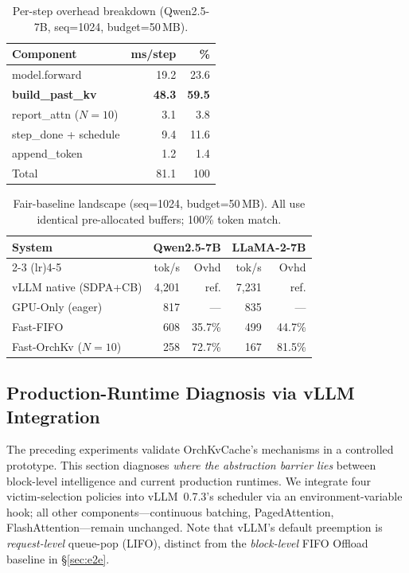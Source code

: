 \documentclass[conference]{IEEEtran}
\begin{document}
\begin{table}[t]
\centering
\caption{Per-step overhead breakdown (Qwen2.5-7B, seq=1024, budget=50\,MB).}
\label{tab:overhead-breakdown}
\small
\setlength{\tabcolsep}{10pt}
\begin{tabular}{@{}lrr@{}}
\toprule
Component & ms/step & \% \\
\midrule
model.forward & 19.2 & 23.6 \\
\textbf{build\_past\_kv} & \textbf{48.3} & \textbf{59.5} \\
report\_attn ($N{=}10$) & 3.1 & 3.8 \\
step\_done + schedule & 9.4 & 11.6 \\
append\_token & 1.2 & 1.4 \\
\midrule
Total & 81.1 & 100 \\
\bottomrule
\end{tabular}
\end{table}

\begin{table}[t]
\centering
\caption{Fair-baseline landscape (seq=1024, budget=50\,MB). All use identical pre-allocated buffers; 100\% token match.}
\label{tab:fair-baseline}
\small
\setlength{\tabcolsep}{6pt}
\begin{tabular}{@{}lrrrr@{}}
\toprule
System & \multicolumn{2}{c}{Qwen2.5-7B} & \multicolumn{2}{c}{LLaMA-2-7B} \\
\cmidrule(lr){2-3} \cmidrule(lr){4-5}
& tok/s & Ovhd & tok/s & Ovhd \\
\midrule
vLLM native (SDPA+CB)  & 4{,}201 & ref. & 7{,}231 & ref. \\
GPU-Only (eager)        & 817 & --- & 835 & --- \\
Fast-FIFO               & 608 & 35.7\% & 499 & 44.7\% \\
Fast-OrchKv ($N{=}10$)  & 258 & 72.7\% & 167 & 81.5\% \\
\bottomrule
\end{tabular}
\end{table}

\subsection{Production-Runtime Diagnosis via vLLM Integration}
\label{sec:vllm-integration}

The preceding experiments validate OrchKvCache's mechanisms in a controlled prototype. This section diagnoses \emph{where the abstraction barrier lies} between block-level intelligence and current production runtimes. We integrate four victim-selection policies into vLLM~0.7.3's scheduler via an environment-variable hook; all other components---continuous batching, PagedAttention, FlashAttention---remain unchanged. Note that vLLM's default preemption is \emph{request-level} queue-pop (LIFO), distinct from the \emph{block-level} FIFO Offload baseline in \S\ref{sec:e2e}.
\end{document}
